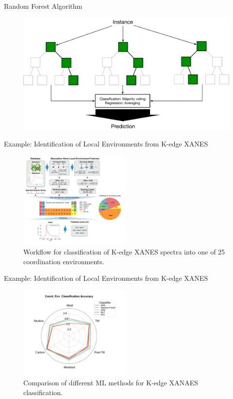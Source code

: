 \documentclass{beamer}
\begin{document}
\begin{frame}{Random Forest Algorithm}
\begin{figure}
    \centering
    \includegraphics[width=\textwidth]{figures/randomforestalgo.pdf}
\end{figure}
\end{frame}



\begin{frame}{Example: Identification of Local Environments from K-edge XANES}
\begin{figure}
    \centering
    \includegraphics[width=0.5\textwidth]{figures/randomforestxanes.pdf}
    \caption{Workflow for classification of K-edge XANES spectra into one of 25 coordination environments.\cite{zhengRandomForestModels2019}}
\end{figure}
\end{frame}


\begin{frame}{Example: Identification of Local Environments from K-edge XANES}
\begin{figure}
    \centering
    \includegraphics[width=0.5\textwidth]{figures/coord_env_class_acc_radar.pdf}
    \caption{Comparison of different ML methods for K-edge XANAES classification.\cite{zhengRandomForestModels2019}}
\end{figure}
\end{frame}
\end{document}
